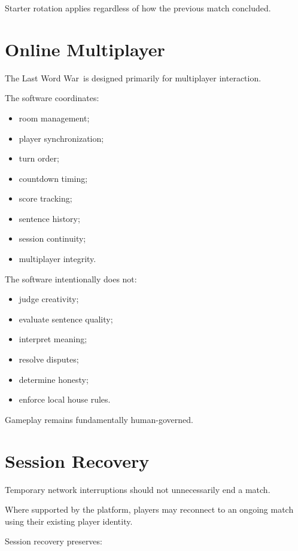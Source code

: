 \documentclass[11pt,a4paper]{article}
\begin{document}
Starter rotation applies regardless of how the previous match concluded.

\section{Online Multiplayer}

The Last Word War\texttrademark\ is designed primarily for multiplayer interaction.

The software coordinates:

\begin{itemize}
    \item room management;
    \item player synchronization;
    \item turn order;
    \item countdown timing;
    \item score tracking;
    \item sentence history;
    \item session continuity;
    \item multiplayer integrity.
\end{itemize}

The software intentionally does not:

\begin{itemize}
    \item judge creativity;
    \item evaluate sentence quality;
    \item interpret meaning;
    \item resolve disputes;
    \item determine honesty;
    \item enforce local house rules.
\end{itemize}

Gameplay remains fundamentally human-governed.

\section{Session Recovery}

Temporary network interruptions should not unnecessarily end a match.

Where supported by the platform, players may reconnect to an ongoing match using their existing player identity.

Session recovery preserves:
\end{document}
